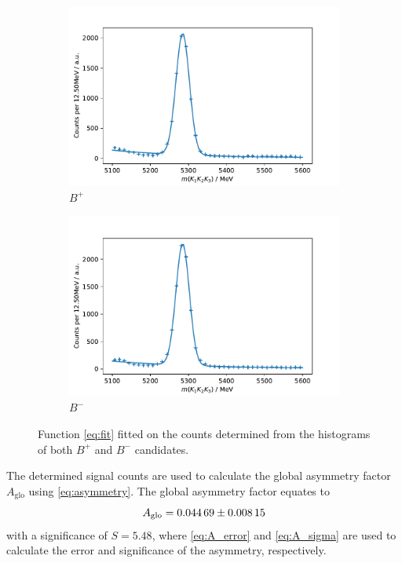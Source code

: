 \begin{figure}[H]
	\centering
	\begin{subfigure}{0.45\textwidth}
		\includegraphics[width=\textwidth]{content/pictures/image_fin/invmassFitBN.pdf}
		\caption{$B^+$}
	\end{subfigure}
	\begin{subfigure}{0.45\textwidth}
		\includegraphics[width=\textwidth]{content/pictures/image_fin/invmassFitBP.pdf}
		\caption{$B^-$}
	\end{subfigure} 
	\caption{Function \autoref{eq:fit} fitted on the counts determined from the histograms of both $B^+$ and $B^-$ candidates.}
	\label{fig:fits}
\end{figure}

The determined signal counts are used to calculate the global asymmetry factor 
$A_\mathrm{glo}$ using \eqref{eq:asymmetry}.  
The global asymmetry factor equates to 
\begin{equation}
	A_\mathrm{glo} = \num{0.04469\pm0.00815}
\end{equation}
with a significance of $S = 5.48$, where \eqref{eq:A_error} and \eqref{eq:A_sigma}
are used to calculate the error and significance of the asymmetry, respectively. \\

